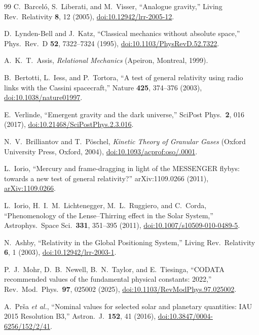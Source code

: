 \documentclass[a4paper,10pt,twocolumn]{ltjsarticle}
\begin{document}
\begin{thebibliography}{99}
C.~Barcel\'o, S.~Liberati, and M.~Visser, ``Analogue gravity,''
Living Rev.\ Relativity \textbf{8}, 12 (2005),
\href{https://doi.org/10.12942/lrr-2005-12}{doi:10.12942/lrr-2005-12}.

D.~Lynden-Bell and J.~Katz, ``Classical mechanics without absolute
space,'' Phys.\ Rev.\ D \textbf{52}, 7322--7324 (1995),
\href{https://doi.org/10.1103/PhysRevD.52.7322}
{doi:10.1103/PhysRevD.52.7322}.

A.~K.~T.~Assis, \emph{Relational Mechanics}
(Apeiron, Montreal, 1999).

B.~Bertotti, L.~Iess, and P.~Tortora, ``A test of general relativity
using radio links with the Cassini spacecraft,''
Nature \textbf{425}, 374--376 (2003),
\href{https://doi.org/10.1038/nature01997}{doi:10.1038/nature01997}.

E.~Verlinde, ``Emergent gravity and the dark universe,''
SciPost Phys.\ \textbf{2}, 016 (2017),
\href{https://doi.org/10.21468/SciPostPhys.2.3.016}
{doi:10.21468/SciPostPhys.2.3.016}.

N.~V.~Brilliantov and T.~P\"oschel,
\emph{Kinetic Theory of Granular Gases}
(Oxford University Press, Oxford, 2004),
\href{https://doi.org/10.1093/acprof:oso/9780198530381.001.0001}
{doi:10.1093/acprof:oso/.0001}.

L.~Iorio, ``Mercury and frame-dragging in light of the MESSENGER
flybys: towards a new test of general relativity?''
arXiv:1109.0266 (2011),
\href{https://arxiv.org/abs/1109.0266}{arXiv:1109.0266}.

L.~Iorio, H.~I.~M.~Lichtenegger, M.~L.~Ruggiero, and C.~Corda,
``Phenomenology of the Lense--Thirring effect in the Solar System,''
Astrophys.\ Space Sci.\ \textbf{331}, 351--395 (2011),
\href{https://doi.org/10.1007/s10509-010-0489-5}
{doi:10.1007/s10509-010-0489-5}.

N.~Ashby, ``Relativity in the Global Positioning System,''
Living Rev.\ Relativity \textbf{6}, 1 (2003),
\href{https://doi.org/10.12942/lrr-2003-1}{doi:10.12942/lrr-2003-1}.

P.~J.~Mohr, D.~B.~Newell, B.~N.~Taylor, and E.~Tiesinga,
``CODATA recommended values of the fundamental physical constants:
2022,'' Rev.\ Mod.\ Phys.\ \textbf{97}, 025002 (2025),
\href{https://doi.org/10.1103/RevModPhys.97.025002}
{doi:10.1103/RevModPhys.97.025002}.

A.~Pr\v{s}a \emph{et al.}, ``Nominal values for selected solar and
planetary quantities: IAU 2015 Resolution B3,''
Astron.\ J.\ \textbf{152}, 41 (2016),
\href{https://doi.org/10.3847/0004-6256/152/2/41}
{doi:10.3847/0004-6256/152/2/41}.

\end{thebibliography}
\end{document}
